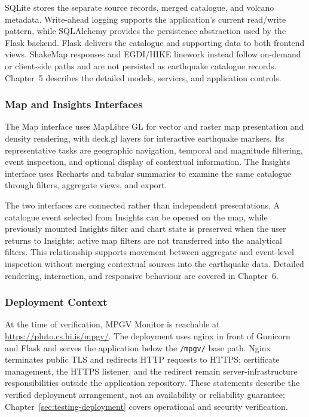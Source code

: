 \documentclass[12pt]{article}
\begin{document}
SQLite stores the separate source records, merged catalogue, and volcano metadata. Write-ahead logging supports the application's current read/write pattern, while SQLAlchemy provides the persistence abstraction used by the Flask backend. Flask delivers the catalogue and supporting data to both frontend views. ShakeMap responses and EGDI/HIKE linework instead follow on-demand or client-side paths and are not persisted as earthquake catalogue records. Chapter~5 describes the detailed models, services, and application controls.

\subsubsection{Map and Insights Interfaces}

The Map interface uses MapLibre GL for vector and raster map presentation and density rendering, with deck.gl layers for interactive earthquake markers. Its representative tasks are geographic navigation, temporal and magnitude filtering, event inspection, and optional display of contextual information. The Insights interface uses Recharts and tabular summaries to examine the same catalogue through filters, aggregate views, and export.

The two interfaces are connected rather than independent presentations. A catalogue event selected from Insights can be opened on the map, while previously mounted Insights filter and chart state is preserved when the user returns to Insights; active map filters are not transferred into the analytical filters. This relationship supports movement between aggregate and event-level inspection without merging contextual sources into the earthquake data. Detailed rendering, interaction, and responsive behaviour are covered in Chapter~6.

\subsubsection{Deployment Context}
\leavevmode\par

At the time of verification, MPGV Monitor is reachable at \url{https://pluto.cs.hi.is/mpgv/}. The deployment uses nginx in front of Gunicorn and Flask and serves the application below the \texttt{/mpgv/} base path. Nginx terminates public TLS and redirects HTTP requests to HTTPS; certificate management, the HTTPS listener, and the redirect remain server-infrastructure responsibilities outside the application repository. These statements describe the verified deployment arrangement, not an availability or reliability guarantee; Chapter~\ref{sec:testing-deployment} covers operational and security verification.
\end{document}
